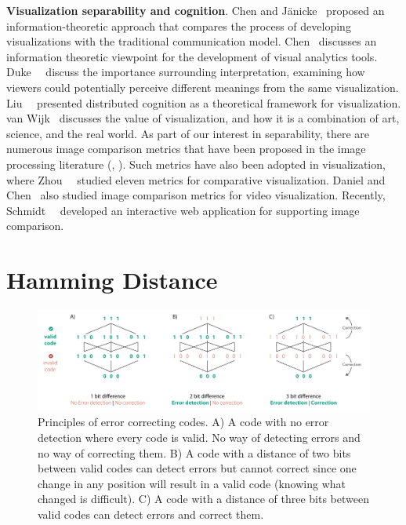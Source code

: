 \noindent\textbf{Visualization separability and cognition}. Chen and J\"{a}nicke~\cite{Chen:2010:TVCG} proposed an information-theoretic approach that compares the process of developing visualizations with the traditional communication model.
Chen~\cite{chen08} discusses an information theoretic viewpoint for the development of visual analytics tools.
Duke~\etal~\cite{duke05} discuss the importance surrounding interpretation, examining how viewers could potentially perceive different meanings from the same visualization.
Liu~\etal~\cite{liu08} presented distributed cognition as a theoretical framework for visualization.
van Wijk~\cite{vanwijk05} discusses the value of visualization, and how it is a combination of art, science, and the real world.
As part of our interest in separability, there are numerous image comparison metrics that have been proposed in the image processing literature (\eg, \cite{Sahasrabudhe99, Eler08}).
Such metrics have also been adopted in visualization, where Zhou~\etal~\cite{Zhou:2002:Vis} studied eleven metrics for comparative visualization.
Daniel and Chen~\cite{Daniel:2003:Vis} also studied image comparison metrics for video visualization.
Recently, Schmidt~\etal~\cite{Schmidt:2013:TVCG} developed an interactive web application for supporting image comparison.

\section{Hamming Distance}
\label{sec:hamming}

\begin{figure}[h!]
\begin{center}
\includegraphics[width=\textwidth]{images/filesystem/latest/Hamming1}
\end{center}
\caption{Principles of error correcting codes.
A) A code with no error detection where every code is valid. No way of detecting errors and no way of correcting them.
B) A code with a distance of two bits between valid codes can detect errors but cannot correct since one change in any position will result in a valid code (knowing what changed is difficult).
C) A code with a distance of three bits between valid codes can detect errors and correct them.}
\label{fig:hamming}
\end{figure}


